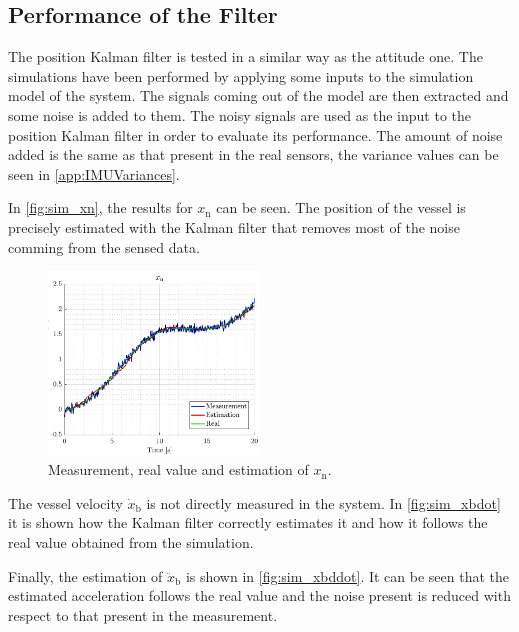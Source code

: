\subsection{Performance of the Filter}
The position Kalman filter is tested in a similar way as the attitude one. The simulations have been performed by applying some inputs to the simulation model of the system. The signals coming out of the model are then extracted and some noise is added to them. The noisy signals are used as the input to the position Kalman filter in order to evaluate its performance. The amount of noise added is the same as that present in the real sensors, the variance values can be seen in \autoref{app:IMUVariances}.

In \autoref{fig:sim_xn}, the results for $x_\mathrm{n}$ can be seen. The position of the vessel is precisely estimated with the Kalman filter that removes most of the noise comming from the sensed data.

\begin{figure}[H]
    \includegraphics[width=0.5\textwidth]{figures/sim_xn}
    \caption{Measurement, real value and estimation of $x_\mathrm{n}$.}
    \label{fig:sim_xn}
\end{figure}

The vessel velocity $\dot{x}_\mathrm{b}$ is not directly measured in the system. In \autoref{fig:sim_xbdot} it is shown how the Kalman filter correctly estimates it and how it follows the real value obtained from the simulation.

Finally, the estimation of $\ddot{x}_\mathrm{b}$ is shown in \autoref{fig:sim_xbddot}. It can be seen that the estimated acceleration follows the real value and the noise present is reduced with respect to that present in the measurement.

